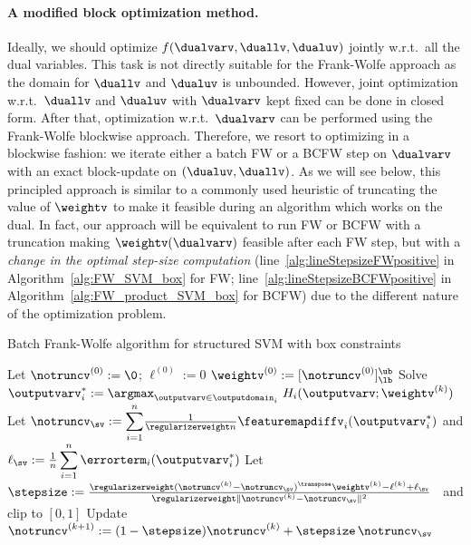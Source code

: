 \documentclass{article}
\begin{document}
%
%
%
%
%
%
%
%
%
%
%
%

\paragraph{A modified block optimization method.}
Ideally, we should optimize $f(\dualvarv,\duallv,\dualuv)$ jointly w.r.t.\ all the dual variables.
This task is not directly suitable for the Frank-Wolfe approach as the domain for $\duallv$ and $\dualuv$ is unbounded.
However, joint optimization w.r.t.~$\duallv$ and $\dualuv$ with $\dualvarv$ kept fixed can be done in closed form.
After that, optimization w.r.t.~$\dualvarv$ can be performed using the Frank-Wolfe blockwise approach.
Therefore, we resort to optimizing in a blockwise fashion: we iterate either a batch FW or a BCFW step on $\dualvarv$ with an exact block-update on $(\dualuv,\duallv)$. As we will see below, this principled approach is similar to a commonly used heuristic of truncating the value of $\weightv$ to make it feasible during an algorithm which works on the dual. In fact, our approach will be equivalent to run FW or BCFW with a truncation making $\weightv(\dualvarv)$ feasible after each FW step, but with a \emph{change in the optimal step-size computation} (line~\ref{alg:lineStepsizeFWpositive} in Algorithm~\ref{alg:FW_SVM_box} for FW; line~\ref{alg:lineStepsizeBCFWpositive} in Algorithm~\ref{alg:FW_product_SVM_box} for BCFW) due to the different nature of the optimization problem.


\begin{algorithm}[t!]
    \caption{Batch Frank-Wolfe algorithm for structured SVM with box constraints} %
    \label{alg:FW_SVM_box}
    \begin{algorithmic}[1]
        \STATE Let $\notruncv^{(0)}:= \0$; $\ell^{(0)}:=0$
        \STATE $\weightv^{(0)}:= [ \notruncv^{(0)} ]_{\lb}^{\ub}$
        \STATE Solve $\outputvarv_i^* := \displaystyle\argmax_{\outputvarv\in\outputdomain_i} \ H_i(\outputvarv;\weightv^{(k)})$ \vspace{-2mm}%
        \ENDFOR %
        \STATE Let $\notruncv_{\sv} := {\displaystyle\sum_{i=1}^n} \frac1{\regularizerweight n} \featuremapdiffv_i(\outputvarv_i^*)$ \;
        and \; $\ell_{\sv} := \frac1n \displaystyle\sum_{i=1}^n \errorterm_i(\outputvarv_i^*)$
        \STATE Let $\stepsize := \frac{\regularizerweight (\notruncv^{(k)}-\notruncv_{\sv})^\transpose \weightv^{(k)} - \ell^{(k)} + \ell_{\sv} }{ \regularizerweight \|\notruncv^{(k)}-\notruncv_{\sv}\|^2 }$ ~and clip  to $[0,1]$ \label{alg:lineStepsizeFWpositive}
        \STATE Update $\notruncv^{(k+1)}:= (1-\stepsize)\notruncv^{(k)}+\stepsize\, \notruncv_{\sv}$
        \ENDFOR
    \end{algorithmic}
\end{algorithm}
\end{document}

